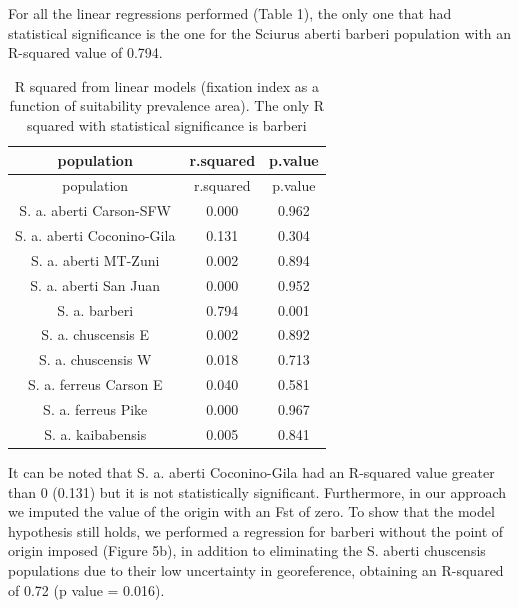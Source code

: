 \documentclass[
]{article}
\begin{document}
For all the linear regressions performed (Table 1), the only one that
had statistical significance is the one for the Sciurus aberti barberi
population with an R-squared value of 0.794.

\begin{longtable}[]{@{}ccc@{}}
\caption{R squared from linear models (fixation index as a function of
suitability prevalence area). The only R squared with statistical
significance is barberi}\tabularnewline
\toprule\noalign{}
population & r.squared & p.value \\
\midrule\noalign{}
\endfirsthead
\toprule\noalign{}
population & r.squared & p.value \\
\midrule\noalign{}
\endhead
\bottomrule\noalign{}
\endlastfoot
S. a. aberti Carson-SFW & 0.000 & 0.962 \\
S. a. aberti Coconino-Gila & 0.131 & 0.304 \\
S. a. aberti MT-Zuni & 0.002 & 0.894 \\
S. a. aberti San Juan & 0.000 & 0.952 \\
S. a. barberi & 0.794 & 0.001 \\
S. a. chuscensis E & 0.002 & 0.892 \\
S. a. chuscensis W & 0.018 & 0.713 \\
S. a. ferreus Carson E & 0.040 & 0.581 \\
S. a. ferreus Pike & 0.000 & 0.967 \\
S. a. kaibabensis & 0.005 & 0.841 \\
\end{longtable}

It can be noted that S. a. aberti Coconino-Gila had an R-squared value
greater than 0 (0.131) but it is not statistically significant.
Furthermore, in our approach we imputed the value of the origin with an
Fst of zero. To show that the model hypothesis still holds, we performed
a regression for barberi without the point of origin imposed (Figure
5b), in addition to eliminating the S. aberti chuscensis populations due
to their low uncertainty in georeference, obtaining an R-squared of 0.72
(p value = 0.016).
\end{document}

